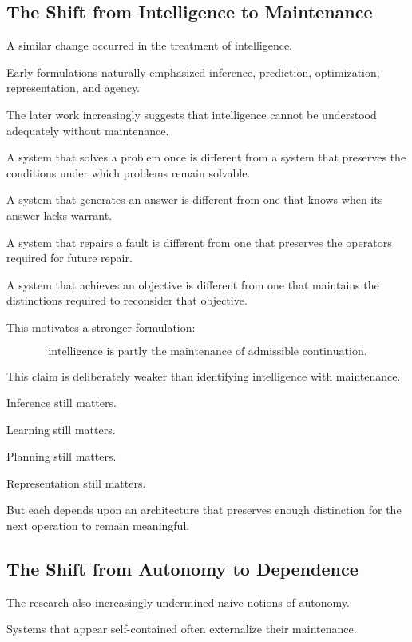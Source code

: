 \documentclass[11pt]{article}
\theoremstyle{remark}
\begin{document}
\subsection{The Shift from Intelligence to Maintenance}

A similar change occurred in the treatment of intelligence.

Early formulations naturally emphasized inference, prediction, optimization,
representation, and agency.

The later work increasingly suggests that intelligence cannot be understood
adequately without maintenance.

A system that solves a problem once is different from a system that preserves
the conditions under which problems remain solvable.

A system that generates an answer is different from one that knows when its
answer lacks warrant.

A system that repairs a fault is different from one that preserves the
operators required for future repair.

A system that achieves an objective is different from one that maintains the
distinctions required to reconsider that objective.

This motivates a stronger formulation:

\begin{equation}
\boxed{
\text{intelligence is partly the maintenance of admissible continuation}.
}
\end{equation}

This claim is deliberately weaker than identifying intelligence with
maintenance.

Inference still matters.

Learning still matters.

Planning still matters.

Representation still matters.

But each depends upon an architecture that preserves enough distinction for the
next operation to remain meaningful.

\subsection{The Shift from Autonomy to Dependence}

The research also increasingly undermined naive notions of autonomy.

Systems that appear self-contained often externalize their maintenance.
\end{document}
